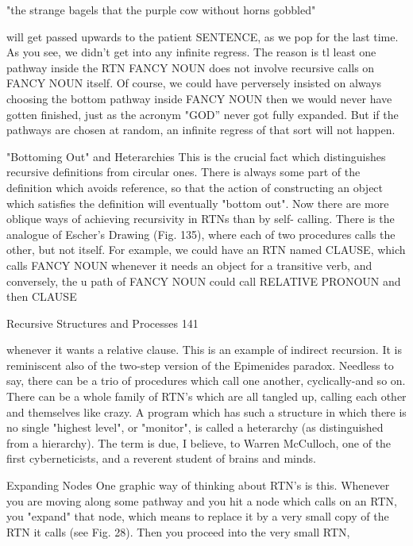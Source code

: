        "the strange bagels that the purple cow without horns gobbled"

will get passed upwards to the patient SENTENCE, as we pop for the last time.
        As you see, we didn't get into any infinite regress. The reason is tl least one
pathway inside the RTN FANCY NOUN does not involve recursive calls on FANCY
NOUN itself. Of course, we could have perversely insisted on always choosing the
bottom pathway inside FANCY NOUN then we would never have gotten finished, just
as the acronym "GOD” never got fully expanded. But if the pathways are chosen at
random, an infinite regress of that sort will not happen.

                      "Bottoming Out" and Heterarchies
        This is the crucial fact which distinguishes recursive definitions from circular
ones. There is always some part of the definition which avoids reference, so that the
action of constructing an object which satisfies the definition will eventually "bottom
out".
        Now there are more oblique ways of achieving recursivity in RTNs than by self-
calling. There is the analogue of Escher's Drawing (Fig. 135), where each of two
procedures calls the other, but not itself. For example, we could have an RTN named
CLAUSE, which calls FANCY NOUN whenever it needs an object for a transitive verb,
and conversely, the u path of FANCY NOUN could call RELATIVE PRONOUN and
then CLAUSE




Recursive Structures and Processes                                                    141

whenever it wants a relative clause. This is an example of indirect recursion. It is
reminiscent also of the two-step version of the Epimenides paradox.
         Needless to say, there can be a trio of procedures which call one another,
cyclically-and so on. There can be a whole family of RTN's which are all tangled up,
calling each other and themselves like crazy. A program which has such a structure in
which there is no single "highest level", or "monitor", is called a heterarchy (as
distinguished from a hierarchy). The term is due, I believe, to Warren McCulloch, one of
the first cyberneticists, and a reverent student of brains and minds.

                                 Expanding Nodes
One graphic way of thinking about RTN's is this. Whenever you are moving along some
pathway and you hit a node which calls on an RTN, you "expand" that node, which
means to replace it by a very small copy of the RTN it calls (see Fig. 28). Then you
proceed into the very small RTN,




